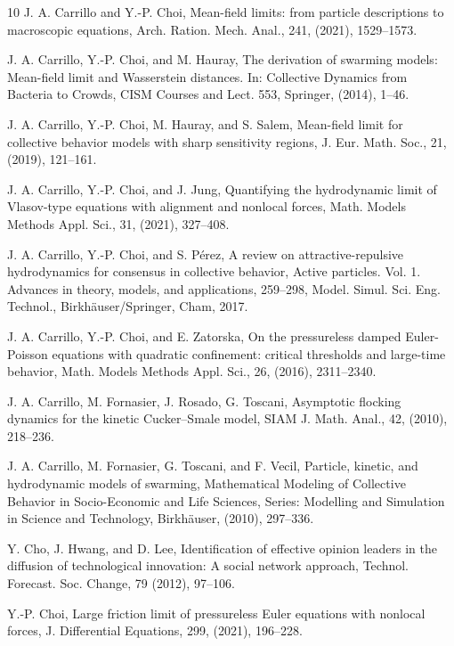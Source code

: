 \documentclass[10pt, reqno]{amsart}
\theoremstyle{definition}
\theoremstyle{remark}
\numberwithin{equation}{section}
\begin{document}
\begin{thebibliography}{10}
 J. A. Carrillo and Y.-P. Choi, Mean-field limits: from particle descriptions to macroscopic equations, Arch. Ration. Mech. Anal., 241, (2021), 1529--1573.

 J. A. Carrillo, Y.-P. Choi, and M. Hauray, The derivation of swarming models: Mean-field limit and Wasserstein distances. In: Collective Dynamics from Bacteria to Crowds, CISM Courses and Lect. 553, Springer, (2014), 1--46.

 J. A. Carrillo, Y.-P. Choi, M. Hauray, and S. Salem, Mean-field limit for collective behavior models with sharp sensitivity regions, J. Eur. Math. Soc., 21, (2019), 121--161.

 J. A. Carrillo, Y.-P. Choi, and J. Jung, Quantifying the hydrodynamic limit of Vlasov-type equations with alignment and nonlocal forces, Math. Models Methods Appl. Sci., 31, (2021), 327--408.

 J. A. Carrillo, Y.-P. Choi, and S. P\'erez, A review on attractive-repulsive hydrodynamics for consensus in collective behavior, Active particles. Vol. 1. Advances in theory, models, and applications, 259--298, Model. Simul. Sci. Eng. Technol., Birkh\"auser/Springer, Cham, 2017.

 J. A. Carrillo, Y.-P. Choi, and E. Zatorska, On the pressureless damped Euler-Poisson equations with quadratic confinement: critical thresholds and large-time behavior, Math. Models Methods Appl. Sci., 26, (2016), 2311--2340.

J. A. Carrillo, M. Fornasier, J. Rosado, G. Toscani, Asymptotic flocking dynamics for the kinetic Cucker--Smale model, SIAM J. Math. Anal., 42, (2010), 218--236.

 J. A. Carrillo, M. Fornasier, G. Toscani, and F. Vecil, Particle, kinetic, and hydrodynamic models of swarming, Mathematical Modeling of Collective Behavior in Socio-Economic and Life Sciences, Series: Modelling and Simulation in Science and Technology, Birkh\"auser, (2010), 297--336.

 Y. Cho, J. Hwang, and D. Lee, Identification of effective opinion leaders in the diffusion of technological innovation: A social network approach, Technol. Forecast. Soc. Change, 79 (2012), 97--106.

 Y.-P. Choi, Large friction limit of pressureless Euler equations with nonlocal forces, J. Differential Equations, 299, (2021), 196--228.


\end{thebibliography}
\end{document}
